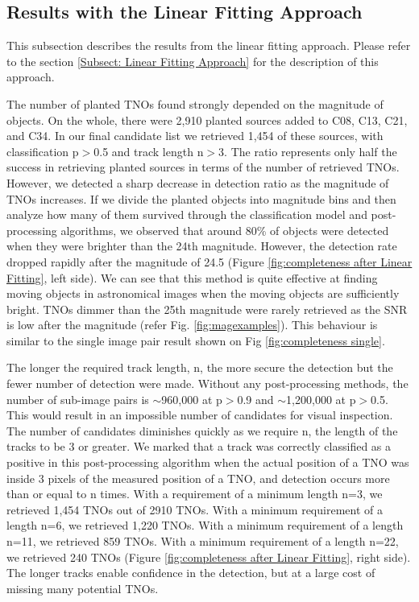 \documentclass{aastex631}
\begin{document}
\subsection{Results with the Linear Fitting Approach}
\label{subsect:Retrieval rate on planted TNOs}

This subsection describes the results from the linear fitting approach.
Please refer to the section \ref{Subsect: Linear Fitting Approach} for the description of this approach.

The number of planted TNOs found strongly depended on the magnitude of objects.
On the whole, there were 2,910 planted sources added to C08, C13, C21, and C34.
In our final candidate list we retrieved 1,454 of these sources, with classification p$>$0.5 and track length n$>$3.
The ratio represents only half the success in retrieving planted sources in terms of the number of retrieved TNOs.
However, we detected a sharp decrease in detection ratio as the magnitude of TNOs increases.
If we divide the planted objects into magnitude bins and then analyze how many of them survived through the classification model and post-processing algorithms, we observed that around 80\% of objects were detected when they were brighter than the 24th magnitude.
However, the detection rate dropped rapidly after the magnitude of 24.5 (Figure \ref{fig:completeness after Linear Fitting}, left side).
We can see that this method is quite effective at finding moving objects in astronomical images when the moving objects are sufficiently bright.
TNOs dimmer than the 25th magnitude were rarely retrieved as the SNR is low after the magnitude (refer Fig. \ref{fig:magexamples}). 
This behaviour is similar to the single image pair result shown on Fig \ref{fig:completeness single}.

The longer the required track length, n, the more secure the detection but the fewer number of detection were made.
Without any post-processing methods, the number of sub-image pairs is $\sim$960,000 at p$>$0.9 and $\sim$1,200,000 at p$>$0.5.
This would result in an impossible number of candidates for visual inspection.
The number of candidates diminishes quickly as we require n, the length of the tracks to be 3 or greater.
We marked that a track was correctly classified as a positive in this post-processing algorithm when the actual position of a TNO was inside 3 pixels of the measured position of a TNO, and detection occurs more than or equal to n times.
With a requirement of a minimum length n=3, we retrieved 1,454 TNOs out of 2910 TNOs.
With a minimum requirement of a length n=6, we retrieved 1,220 TNOs.
With a minimum requirement of a length n=11, we retrieved 859 TNOs.
With a minimum requirement of a length n=22, we retrieved 240 TNOs (Figure \ref{fig:completeness after Linear Fitting}, right side).
The longer tracks enable confidence in the detection, but at a large cost of missing many potential TNOs.
\end{document}
